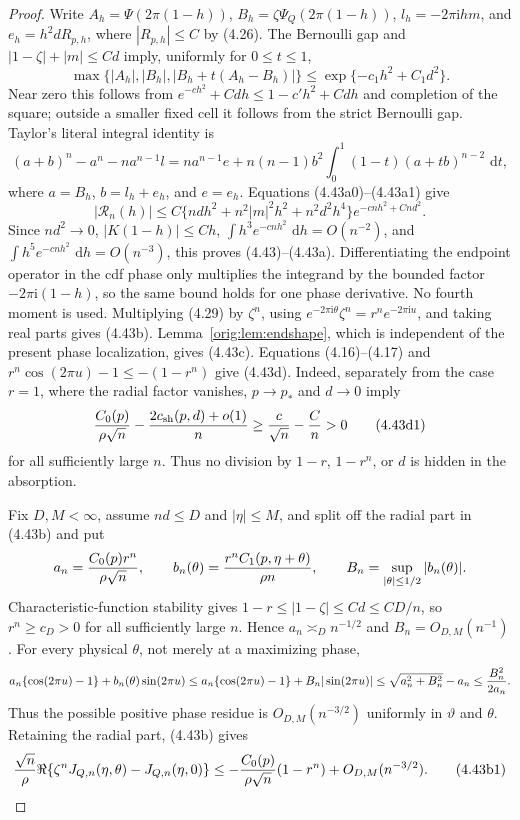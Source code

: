 \documentclass[11pt,a4paper]{article}
\numberwithin{equation}{section}
\theoremstyle{definition}
\theoremstyle{remark}
\newcommand{\ii}{\mathrm i}
\newcommand{\dd}{\,\mathrm d}
\begin{document}
\begin{proof}
Write $A_h=\Psi(2\pi(1-h))$, $B_h=\zeta\Psi_Q(2\pi(1-h))$,
$l_h=-2\pi\ii hm$, and $e_h=h^2dR_{p,h}$, where $|R_{p,h}|\le C$ by
(4.26).  The Bernoulli gap and $|1-\zeta|+|m|\le Cd$ imply, uniformly for
$0\le t\le1$,
\[
 \max\{|A_h|,|B_h|,|B_h+t(A_h-B_h)|\}
 \le \exp\{-c_1h^2+C_1d^2\}.                         \tag{4.43a0}
\]
Near zero this follows from
$e^{-ch^2}+Cdh\le1-c'h^2+Cdh$ and completion of the square; outside a
smaller fixed cell it follows from the strict Bernoulli gap.  Taylor's
literal integral identity is
\[
 (a+b)^n-a^n-na^{n-1}l
 =na^{n-1}e+n(n-1)b^2\int_0^1(1-t)(a+tb)^{n-2}\,\dd t,              \tag{4.43a1}
\]
where $a=B_h$, $b=l_h+e_h$, and $e=e_h$.  Equations (4.43a0)--(4.43a1)
give
\[
 |\mathcal R_n(h)|\le C\{ndh^2+n^2|m|^2h^2+n^2d^2h^4\}
 e^{-cnh^2+Cnd^2}.
\]
Since $nd^2\to0$, $|K(1-h)|\le Ch$,
$\int h^3e^{-cnh^2}\,\dd h=O(n^{-2})$, and
$\int h^5e^{-cnh^2}\,\dd h=O(n^{-3})$, this proves
(4.43)--(4.43a).  Differentiating the endpoint operator in the cdf phase
only multiplies the integrand by the bounded factor $-2\pi\ii(1-h)$, so
the same bound holds for one phase derivative.  No fourth moment is used.
Multiplying (4.29) by $\zeta^n$, using
$e^{-2\pi\ii\theta}\zeta^n=r^n e^{-2\pi\ii u}$, and taking real parts gives
(4.43b).  Lemma~\ref{orig:lem:endshape}, which is independent of the present
phase localization, gives (4.43c).  Equations (4.16)--(4.17) and
$r^n\cos(2\pi u)-1\le-(1-r^n)$ give (4.43d).
Indeed, separately from the case $r=1$, where the radial factor vanishes,
$p\to p_*$ and $d\to0$ imply
\[
 {C_0(p)\over\rho\sqrt n}
 -{2c_{\rm sh}(p,d)+o(1)\over n}
 \ge {c\over\sqrt n}-{C\over n}>0                    \tag{4.43d1}
\]
for all sufficiently large $n$.  Thus no division by $1-r$, $1-r^n$, or
$d$ is hidden in the absorption.

Fix $D,M<\infty$, assume $nd\le D$ and $|\eta|\le M$, and split off the
radial part in (4.43b)
and put
\[
 a_n={C_0(p)r^n\over\rho\sqrt n},\qquad
 b_n(\theta)={r^nC_1(p,\eta+\theta)\over\rho n},\qquad
 B_n=\sup_{|\theta|\le1/2}|b_n(\theta)|.
\]
Characteristic-function stability gives
$1-r\le |1-\zeta|\le Cd\le CD/n$, so $r^n\ge c_D>0$ for all sufficiently
large $n$.  Hence $a_n\asymp_D n^{-1/2}$ and
$B_n=O_{D,M}(n^{-1})$.
For every physical $\theta$, not merely at a maximizing phase,
\[
 a_n\{\cos(2\pi u)-1\}+b_n(\theta)\sin(2\pi u)
 \le a_n\{\cos(2\pi u)-1\}+B_n|\sin(2\pi u)|
 \le\sqrt{a_n^2+B_n^2}-a_n\le {B_n^2\over2a_n}.
\]
Thus the possible positive phase residue is $O_{D,M}(n^{-3/2})$ uniformly in
$\vartheta$ and $\theta$.  Retaining the radial part, (4.43b) gives
\[
 {\sqrt n\over\rho}\Re\{\zeta^nJ_{Q,n}(\eta,\theta)
                         -J_{Q,n}(\eta,0)\}
 \le -{C_0(p)\over\rho\sqrt n}(1-r^n)+O_{D,M}(n^{-3/2}). \tag{4.43b1}
\]


\end{proof}
\end{document}
